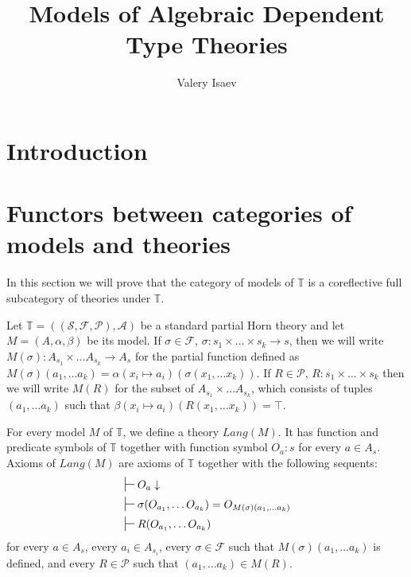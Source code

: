 \documentclass[reqno]{amsart}
\theoremstyle{definition}
\theoremstyle{remark}
\numberwithin{figure}{section}
\begin{document}
\title{Models of Algebraic Dependent Type Theories}

\author{Valery Isaev}

\begin{abstract}
\end{abstract}

\maketitle

 \makeatletter
    \providecommand\@dotsep{5}
  \makeatother
  \listoftodos\relax

\section{Introduction}

\section{Functors between categories of models and theories}

In this section we will prove that the category of models of $\mathbb{T}$ is a coreflective full subcategory of theories under $\mathbb{T}$.

Let $\mathbb{T} = ((\mathcal{S},\mathcal{F},\mathcal{P}),\mathcal{A})$ be a standard partial Horn theory and let $M = (A,\alpha,\beta)$ be its model.
If $\sigma \in \mathcal{F}$, $\sigma : s_1 \times \ldots \times s_k \to s$, then we will write $M(\sigma) : A_{s_1} \times \ldots A_{s_k} \to A_s$
    for the partial function defined as $M(\sigma)(a_1, \ldots a_k) = \alpha(x_i \mapsto a_i)(\sigma(x_1, \ldots x_k))$.
If $R \in \mathcal{P}$, $R : s_1 \times \ldots \times s_k$ then we will write $M(R)$ for the subset of $A_{s_1} \times \ldots A_{s_k}$,
    which consists of tuples $(a_1, \ldots a_k)$ such that $\beta(x_i \mapsto a_i)(R(x_1, \ldots x_k)) = \top$.

For every model $M$ of $\mathbb{T}$, we define a theory $Lang(M)$.
It has function and predicate symbols of $\mathbb{T}$ together with function symbol $O_a : s$ for every $a \in A_s$.
Axioms of $Lang(M)$ are axioms of $\mathbb{T}$ together with the following sequents:
\begin{align*}
& \sststile{}{} O_a \downarrow \\
& \sststile{}{} \sigma(O_{a_1}, \ldots O_{a_k}) = O_{M(\sigma)(a_1, \ldots a_k)} \\
& \sststile{}{} R(O_{a_1}, \ldots O_{a_k})
\end{align*}
for every $a \in A_s$, every $a_i \in A_{s_i}$,
every $\sigma \in \mathcal{F}$ such that $M(\sigma)(a_1, \ldots a_k)$ is defined,
and every $R \in \mathcal{P}$ such that $(a_1, \ldots a_k) \in M(R)$.
\end{document}
